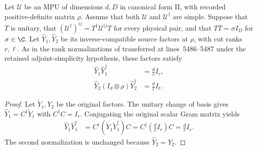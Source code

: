 \begin{lemma}
    \label{thm:mpug_inverse_source_y_rank}
    \leanok
    Let $\mathcal U$ be an MPU of dimensions $d,D$ in canonical form II,
    with recorded positive-definite matrix $\rho$. Assume that both
    $\mathcal U$ and $\mathcal U^\dagger$ are simple. Suppose that $T$
    is unitary, that $(\mathcal U^\dagger)^{ij}=T^\dagger\mathcal U^{ij}T$
    for every physical pair, and that $T\overline T=\sigma I_D$ for
    $\sigma\in\C$. Let $\widehat Y_1,\widehat Y_2$ be its
    inverse-compatible source factors at $\rho$, with cut ranks $r,\ell$.
    As in the rank normalizations of
    \cite[lines~1064--1119]{FrancoRubio2025MPUGauging} transferred at
    lines~5486--5487 under the retained adjoint-simplicity hypothesis, these
    factors satisfy
    \begin{align}
        \widehat Y_1\widehat Y_1^\dagger & =\frac{d}{r}I_r,       \\
        \widehat Y_2(I_d\otimes\rho)\widehat Y_2^\dagger
                                         & =\frac{d}{\ell}I_\ell.
    \end{align}
\end{lemma}
\begin{proof}\leanok
    Let $\widetilde Y_1,Y_2$ be the original factors. The unitary change of basis
    gives $\widehat Y_1=C^\dagger\widetilde Y_1$ with $C^\dagger C=I_r$.
    Conjugating the original scalar Gram matrix yields
    \begin{align}
        \widehat Y_1\widehat Y_1^\dagger
         & =C^\dagger(\widetilde Y_1\widetilde Y_1^\dagger)C
        =C^\dagger\left(\frac{d}{r}I_r\right)C
        =\frac{d}{r}I_r.
    \end{align}
    The second normalization is unchanged because $\widehat Y_2=Y_2$.
\end{proof}

